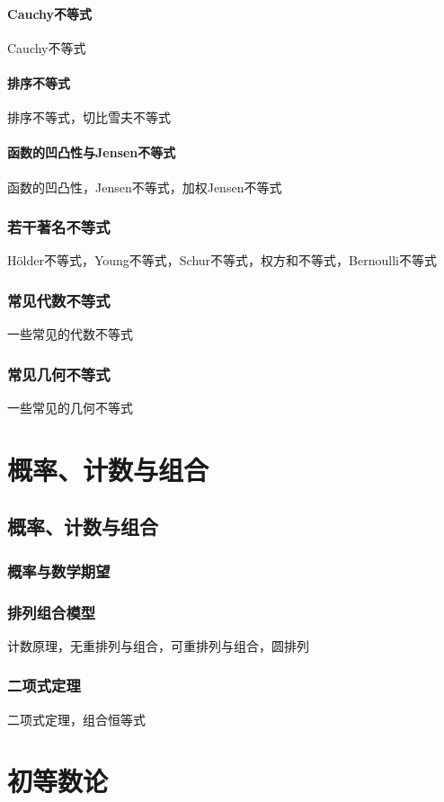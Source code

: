 \documentclass[lang=cn, zihao=4.5]{elegantbook}
\begin{document}
\subsection{Cauchy不等式}

Cauchy不等式

\subsection{排序不等式}

排序不等式，切比雪夫不等式

\subsection{函数的凹凸性与Jensen不等式}

函数的凹凸性，Jensen不等式，加权Jensen不等式

\section{若干著名不等式}

Hölder不等式，Young不等式，Schur不等式，权方和不等式，Bernoulli不等式

\section{常见代数不等式}

一些常见的代数不等式

\section{常见几何不等式}

一些常见的几何不等式

\part{概率、计数与组合}

\chapter{概率、计数与组合}

\section{概率与数学期望}

\section{排列组合模型}

计数原理，无重排列与组合，可重排列与组合，圆排列

\section{二项式定理}

二项式定理，组合恒等式

\part{初等数论}
\end{document}
